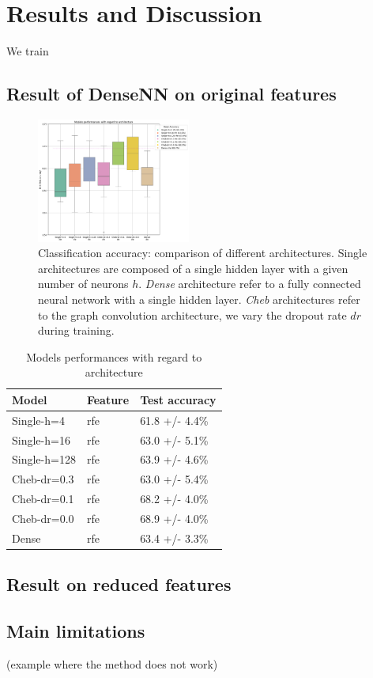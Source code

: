 
\section{Results and Discussion}

We train

\subsection{Result of DenseNN on original features}

\begin{figure}[h!]
    \centering
    \includegraphics[width=0.45\textwidth]{figures/model_performances_architecture.png}
    \caption{Classification accuracy: comparison of different architectures.
    Single architectures are composed of a single hidden layer with a given number of neurons $h$.
    \textit{Dense} architecture refer to a fully connected neural network with a single hidden layer.
    \textit{Cheb} architectures refer to the graph convolution architecture, we vary the dropout rate $dr$
    during training.}
    \Description{}
    \label{fig:results_architecture}
\end{figure}

\begin{table}[H]
	\begin{center}
		\begin{tabular}{lll}
			Model & Feature & Test accuracy \\
			\hline
			Single-h=4 & rfe & 61.8 +/- 4.4\% \\
			Single-h=16 & rfe & 63.0 +/- 5.1\% \\
			Single-h=128 & rfe & 63.9 +/- 4.6\% \\
			Cheb-dr=0.3 & rfe & 63.0 +/- 5.4\% \\
			Cheb-dr=0.1 & rfe & 68.2 +/- 4.0\% \\
			Cheb-dr=0.0 & rfe & 68.9 +/- 4.0\% \\
			Dense & rfe & 63.4 +/- 3.3\% \\
		\end{tabular}
	\end{center}
	\caption{Models performances with regard to architecture}
	\label{table:dependance_on_architecture}
\end{table}


\subsection{Result on reduced features}

\subsection{Main limitations}

(example where the method does not work) 
